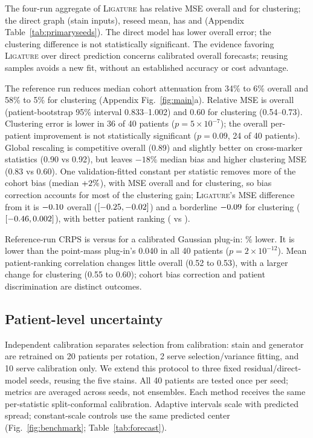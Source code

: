 \documentclass[10pt,letterpaper]{article}
\theoremstyle{definition}
\theoremstyle{remark}
\newcommand{\method}{\textnormal{\textsc{Ligature}}}
\begin{document}
The four-run aggregate of \method{} has relative MSE \SeedAllMSE{} overall and \SeedSameMSE{} for clustering; the direct graph (stain inputs), reseed mean, has \DirectAllMSE{} and \DirectSameMSE{} (Appendix Table~\ref{tab:primaryseeds}). The direct model has lower overall error; the clustering difference is not statistically significant. The evidence favoring \method{} over direct prediction concerns calibrated overall forecasts; reusing samples avoids a new fit, without an established accuracy or cost advantage.

The reference run reduces median cohort attenuation from 34\% to 6\% overall and 58\% to 5\% for clustering (Appendix Fig.~\ref{fig:main}a). Relative MSE is \RefMSE{} overall (patient-bootstrap 95\% interval 0.833--1.002) and 0.60 for clustering (0.54--0.73). Clustering error is lower in 36 of 40 patients ($p=5\times10^{-7}$); the overall per-patient improvement is not statistically significant ($p=0.09$, 24 of 40 patients). Global rescaling is competitive overall (0.89) and slightly better on cross-marker statistics (0.90 vs 0.92), but leaves $-18\%$ median bias and higher clustering MSE (0.83 vs 0.60). One validation-fitted constant per statistic removes more of the cohort bias (median $+2\%$), with MSE \BaseRefConstAll{} overall and \BaseRefConstSame{} for clustering, so bias correction accounts for most of the clustering gain; \method{}'s MSE difference from it is $-0.10$ overall ($[-0.25,-0.02]$) and a borderline $-0.09$ for clustering ($[-0.46,0.002]$), with better patient ranking (\BaseRefLigRho{} vs \BaseRefConstRho{}).

Reference-run CRPS is \RefCRPS{} versus \GaussianCRPS{} for a calibrated Gaussian plug-in: \CRPSReduction\% lower. It is lower than the point-mass plug-in's 0.040 in all 40 patients ($p=2\times10^{-12}$). Mean patient-ranking correlation changes little overall (0.52 to 0.53), with a larger change for clustering (0.55 to 0.60); cohort bias correction and patient discrimination are distinct outcomes.



\subsection{Patient-level uncertainty}
Independent calibration separates selection from calibration: stain and generator are retrained on 20 patients per rotation, 2 serve selection/variance fitting, and 10 serve calibration only. We extend this protocol to three fixed residual/direct-model seeds, reusing the five stains. All 40 patients are tested once per seed; metrics are averaged across seeds, not ensembles. Each method receives the same per-statistic split-conformal calibration. Adaptive intervals scale with predicted spread; constant-scale controls use the same predicted center (Fig.~\ref{fig:benchmark}; Table~\ref{tab:forecast}).
\end{document}
